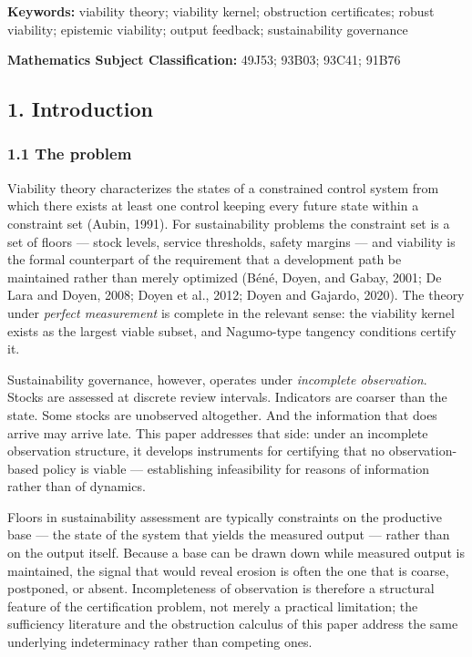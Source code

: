 \documentclass[11pt]{article}
\theoremstyle{definition}
\begin{document}
\textbf{Keywords:} viability theory; viability kernel; obstruction
certificates; robust viability; epistemic viability; output feedback;
sustainability governance

\textbf{Mathematics Subject Classification:} 49J53; 93B03; 93C41; 91B76

\subsection{1. Introduction}\label{introduction}

\subsubsection{1.1 The problem}\label{the-problem}

Viability theory characterizes the states of a constrained control
system from which there exists at least one control keeping every future
state within a constraint set (Aubin, 1991). For sustainability problems
the constraint set is a set of floors --- stock levels, service
thresholds, safety margins --- and viability is the formal counterpart
of the requirement that a development path be maintained rather than
merely optimized (B\'en\'e, Doyen, and Gabay, 2001; De Lara and Doyen, 2008;
Doyen et al., 2012; Doyen and Gajardo, 2020). The theory under
\emph{perfect measurement} is complete in the relevant sense: the
viability kernel exists as the largest viable subset, and Nagumo-type
tangency conditions certify it.

Sustainability governance, however, operates under \emph{incomplete
observation}. Stocks are assessed at discrete review intervals.
Indicators are coarser than the state. Some stocks are unobserved
altogether. And the information that does arrive may arrive late. This paper addresses that side: under an incomplete observation structure, it develops instruments for certifying that no
observation-based policy is viable --- establishing infeasibility for
reasons of information rather than of dynamics.

Floors in sustainability assessment are typically constraints on the
productive base --- the state of the system that yields the measured
output --- rather than on the output itself. Because a base can be drawn
down while measured output is maintained, the signal that would reveal
erosion is often the one that is coarse, postponed, or absent.
Incompleteness of observation is therefore a structural feature of the
certification problem, not merely a practical limitation; the
sufficiency literature and the obstruction calculus of this paper
address the same underlying indeterminacy rather than competing ones.
\end{document}
